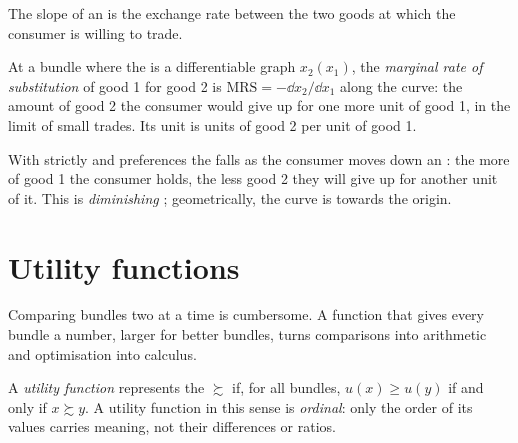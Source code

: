 The slope of an  is the exchange rate between the two
goods at which the consumer is willing to trade.

\begin{definition}\label{def:b1:preferences-and-utility:mrs}
At a bundle where the  is a differentiable graph
$x_2(x_1)$, the \emph{marginal rate of substitution} of good 1 for good 2 is
$\mathrm{MRS} = -\dd x_2/\dd x_1$ along the curve: the amount of good 2 the
consumer would give up for one more unit of good 1, in the limit of small
trades. Its unit is units of good 2 per unit of good 1.
\end{definition}

With strictly  and  preferences the  falls as the consumer
moves down an : the more of good 1 the consumer holds,
the less good 2 they will give up for another unit of it. This is
\emph{diminishing }; geometrically, the curve is  towards the
origin.

\section{Utility functions}\label{sec:b1:preferences-and-utility:utility}

Comparing bundles two at a time is cumbersome. A function that gives every
bundle a number, larger for better bundles, turns comparisons into
arithmetic and optimisation into calculus.

\begin{definition}\label{def:b1:preferences-and-utility:utility}
A \emph{utility function} represents the  $\succsim$ if,
for all bundles, $u(x) \ge u(y)$ if and only if $x \succsim y$. A utility
function in this sense is \emph{ordinal}: only the order of its values
carries meaning, not their differences or ratios.
\end{definition}

